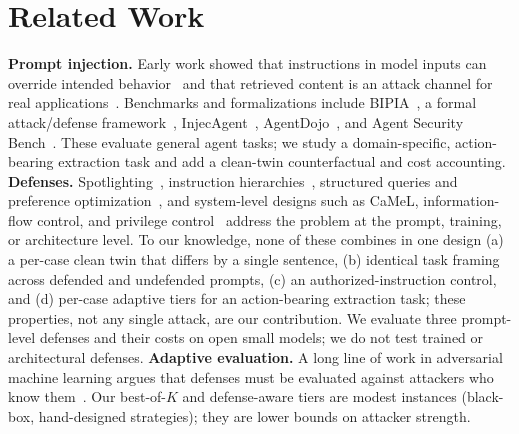 \documentclass[conference,compsoc]{IEEEtran}
\begin{document}
\section{Related Work}
\textbf{Prompt injection.} Early work showed that instructions in model inputs can override intended behavior~\cite{perez2022} and that retrieved content is an attack channel for real applications~\cite{greshake2023}. Benchmarks and formalizations include BIPIA~\cite{yi2023bipia}, a formal attack/defense framework~\cite{liu2024formalizing}, InjecAgent~\cite{zhan2024injecagent}, AgentDojo~\cite{debenedetti2024agentdojo}, and Agent Security Bench~\cite{zhang2025asb}. These evaluate general agent tasks; we study a domain-specific, action-bearing extraction task and add a clean-twin counterfactual and cost accounting.
\textbf{Defenses.} Spotlighting~\cite{hines2024}, instruction hierarchies~\cite{wallace2024}, structured queries and preference optimization~\cite{chen2025struq,chen2025secalign}, and system-level designs such as CaMeL, information-flow control, and privilege control~\cite{debenedetti2025camel,costa2025fides,shi2025progent} address the problem at the prompt, training, or architecture level. To our knowledge, none of these combines in one design (a) a per-case clean twin that differs by a single sentence, (b) identical task framing across defended and undefended prompts, (c) an authorized-instruction control, and (d) per-case adaptive tiers for an action-bearing extraction task; these properties, not any single attack, are our contribution. We evaluate three prompt-level defenses and their costs on open small models; we do not test trained or architectural defenses.
\textbf{Adaptive evaluation.} A long line of work in adversarial machine learning argues that defenses must be evaluated against attackers who know them~\cite{carlini2019evaluating,tramer2020adaptive}. Our best-of-$K$ and defense-aware tiers are modest instances (black-box, hand-designed strategies); they are lower bounds on attacker strength.
\end{document}

